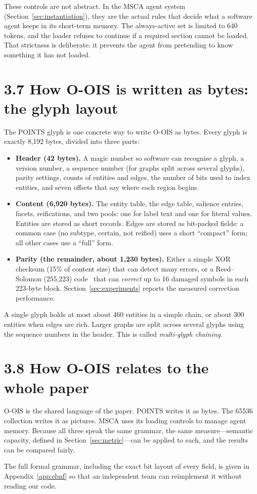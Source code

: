These controls are not abstract. In the MSCA agent system (Section~\ref{sec:instantiation}), they are the actual rules that decide what a software agent keeps in its short-term memory. The always-active set is limited to 640 tokens, and the loader refuses to continue if a required section cannot be loaded. That strictness is deliberate: it prevents the agent from pretending to know something it has not loaded.

\section*{3.7 How O-OIS is written as bytes: the glyph layout}

The POINTS glyph is one concrete way to write O-OIS as bytes. Every glyph is exactly 8,192 bytes, divided into three parts:

\begin{itemize}
\item \textbf{Header (42 bytes).} A magic number so software can recognise a glyph, a version number, a sequence number (for graphs split across several glyphs), parity settings, counts of entities and edges, the number of bits used to index entities, and seven offsets that say where each region begins.
\item \textbf{Content (6,920 bytes).} The entity table, the edge table, salience entries, facets, reifications, and two pools: one for label text and one for literal values. Entities are stored as short records. Edges are stored as bit-packed fields: a common case (no subtype, certain, not reified) uses a short ``compact'' form; all other cases use a ``full'' form.
\item \textbf{Parity (the remainder, about 1,230 bytes).} Either a simple XOR checksum (15\% of content size) that can detect many errors, or a Reed--Solomon (255,223) code~\cite{reed1960polynomial} that can \textit{correct} up to 16 damaged symbols in each 223-byte block. Section~\ref{sec:experiments} reports the measured correction performance.
\end{itemize}

A single glyph holds at most about 460 entities in a simple chain, or about 300 entities when edges are rich. Larger graphs are split across several glyphs using the sequence numbers in the header. This is called \textit{multi-glyph chaining}.

\section*{3.8 How O-OIS relates to the whole paper}

O-OIS is the shared language of the paper. POINTS writes it as bytes. The 65536 collection writes it as pictures. MSCA uses its loading controls to manage agent memory. Because all three speak the same grammar, the same measure---semantic capacity, defined in Section~\ref{sec:metric}---can be applied to each, and the results can be compared fairly.

The full formal grammar, including the exact bit layout of every field, is given in Appendix~\ref{app:ebnf} so that an independent team can reimplement it without reading our code.
